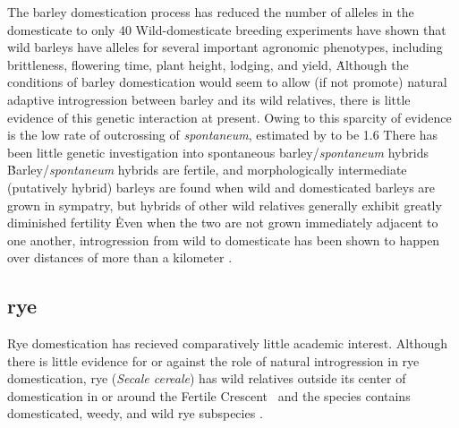 \documentclass[11pt]{article}
\begin{document}
The barley domestication process has reduced the number of alleles in the domesticate to only 40%
Wild-domesticate breeding experiments have shown that wild barleys have alleles for several important agronomic phenotypes, including brittleness, flowering time, plant height, lodging, and yield,  \cite{von2006ab, handley1994chromosome}\.
Although the conditions of barley domestication would seem to allow (if not promote) natural adaptive introgression between barley and its wild relatives, there is little evidence of this genetic interaction at present.
Owing to this sparcity of evidence is the low rate of outcrossing of \emph{spontaneum}, estimated by \cite{brown1978outcrossing} to be 1.6%
There has been little genetic investigation into spontaneous barley/\emph{spontaneum} hybrids \cite{ellstrand2003dangerous}\.
Barley/\emph{spontaneum} hybrids are fertile, and morphologically intermediate (putatively hybrid) barleys are found when wild and domesticated barleys are grown in sympatry, but hybrids of other wild relatives generally exhibit greatly diminished fertility \cite{ellstrand2003dangerous, harlan1995living}\.
Even when the two are not grown immediately adjacent to one another, introgression from wild to domesticate has been shown to happen over distances of more than a kilometer \cite{hillman2001new}.










\subsection*{rye}

Rye domestication has recieved comparatively little academic interest.
Although there is little evidence for or against the role of natural introgression in rye domestication, rye (\emph{Secale cereale}) has wild relatives outside its center of domestication in or around the Fertile Crescent \cite{vavilov1928geographical}\, and the species contains domesticated, weedy, and wild rye subspecies \cite{khush1961cytogenetic}.


\end{document}
